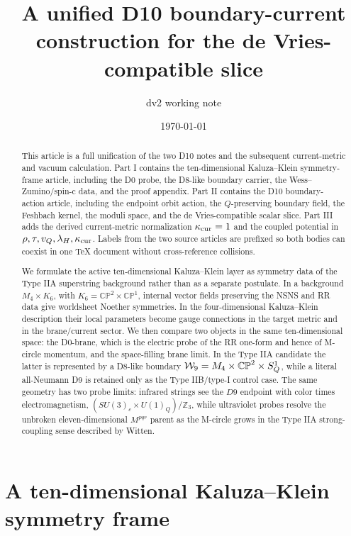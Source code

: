 \documentclass[11pt]{article}
\title{A unified D10 boundary-current construction for the de Vries-compatible slice}
\author{dv2 working note}
\date{\today}
\newcommand{\CP}{\mathbb{CP}}
\newcommand{\ZZ}{\mathbb{Z}}
\theoremstyle{plain}
\theoremstyle{definition}
\begin{document}
\maketitle

\begin{abstract}
This article is a full unification of the two D10 notes and the subsequent
current-metric and vacuum calculation.  Part I contains the ten-dimensional
Kaluza--Klein symmetry-frame article, including the D0 probe, the D8-like
boundary carrier, the Wess--Zumino/spin-c data, and the proof appendix.  Part II
contains the D10 boundary-action article, including the endpoint orbit action,
the \(Q\)-preserving boundary field, the Feshbach kernel, the moduli space, and
the de Vries-compatible scalar slice.  Part III adds the derived current-metric
normalization \(\kappa_{\rm cur}=1\) and the coupled potential in
\(\rho,\tau,v_Q,\lambda_H,\kappa_{\rm cur}\).  Labels from the two source
articles are prefixed so both bodies can coexist in one TeX document without
cross-reference collisions.
\end{abstract}

\part{A ten-dimensional Kaluza--Klein symmetry frame}

\begin{abstract}
We formulate the active ten-dimensional Kaluza--Klein layer as symmetry data of
the Type IIA superstring background rather than as a separate postulate.  In a
background \(M_4\times K_6\), with \(K_6=\CP^2\times\CP^1\), internal vector
fields preserving the NSNS and RR data give worldsheet Noether symmetries.  In
the four-dimensional Kaluza--Klein description their local parameters become
gauge connections in the target metric and in the brane/current sector.  We then
compare two objects in the same ten-dimensional space: the D0-brane, which is
the electric probe of the RR one-form and hence of M-circle momentum, and the
space-filling brane limit.  In the Type IIA candidate the latter is represented
by a D8-like boundary \({\cal W}_9=M_4\times\CP^2\times S^1_Q\), while a literal
all-Neumann D9 is retained only as the Type IIB/type-I control case.  The same
geometry has two probe limits: infrared strings see the \(D9\) endpoint with
color times electromagnetism, \((SU(3)_c\times U(1)_Q)/\ZZ_3\), while ultraviolet
probes resolve the unbroken eleven-dimensional \(M^{pqr}\) parent as the
M-circle grows in the Type IIA strong-coupling sense described by Witten.
\end{abstract}
\end{document}
